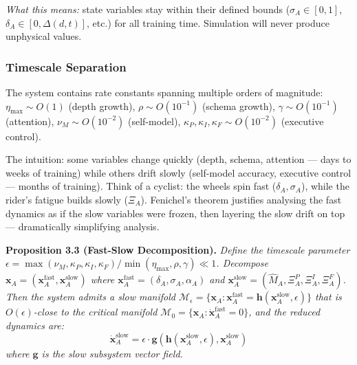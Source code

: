 \documentclass[10pt]{article}
\begin{document}
\noindent\textit{What this means:} state variables stay within their defined
bounds ($\sigma_A \in [0,1]$, $\delta_A \in [0, \Delta(d,t)]$, etc.) for all
training time. Simulation will never produce unphysical values.

\subsubsection{Timescale Separation}\label{sec:timescale}

The system contains rate constants spanning multiple orders of magnitude:
$\eta_{\max} \sim O(1)$ (depth growth), $\rho \sim O(10^{-1})$ (schema growth),
$\gamma \sim O(10^{-1})$ (attention), $\nu_M \sim O(10^{-2})$ (self-model),
$\kappa_P, \kappa_I, \kappa_F \sim O(10^{-2})$ (executive control).

The intuition: some variables change quickly (depth, schema, attention ---
days to weeks of training) while others drift slowly (self-model accuracy,
executive control --- months of training). Think of a cyclist: the wheels
spin fast ($\delta_A, \sigma_A$), while the rider's fatigue builds slowly
($\Xi_A$). Fenichel's theorem justifies analysing the fast dynamics as if
the slow variables were frozen, then layering the slow drift on top ---
dramatically simplifying analysis.

\textbf{Proposition 3.3 (Fast-Slow Decomposition).}
\textit{Define the timescale parameter $\epsilon = \max(\nu_M, \kappa_P, \kappa_I, \kappa_F) / \min(\eta_{\max}, \rho, \gamma) \ll 1$.
Decompose $\mathbf{x}_A = (\mathbf{x}_A^{\text{fast}}, \mathbf{x}_A^{\text{slow}})$
where $\mathbf{x}_A^{\text{fast}} = (\delta_A, \sigma_A, \alpha_A)$ and
$\mathbf{x}_A^{\text{slow}} = (\hat{M}_A, \Xi_A^P, \Xi_A^I, \Xi_A^F)$.
Then the system admits a slow manifold
$\mathcal{M}_\epsilon = \{\mathbf{x}_A : \mathbf{x}_A^{\text{fast}} = \mathbf{h}(\mathbf{x}_A^{\text{slow}}, \epsilon)\}$
that is $O(\epsilon)$-close to the critical manifold
$\mathcal{M}_0 = \{ \mathbf{x}_A : \dot{\mathbf{x}}_A^{\text{fast}} = 0 \}$, and the reduced dynamics are:
\begin{equation}\label{eq:reduced-dynamics}
\dot{\mathbf{x}}_A^{\text{slow}} = \epsilon \cdot \mathbf{g}(\mathbf{h}(\mathbf{x}_A^{\text{slow}}, \epsilon), \mathbf{x}_A^{\text{slow}})
\end{equation}
where $\mathbf{g}$ is the slow subsystem vector field.}
\end{document}
